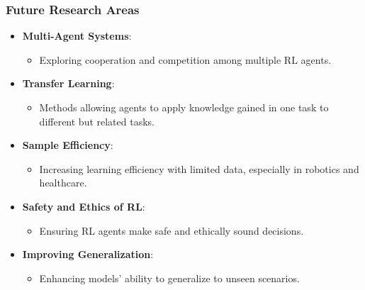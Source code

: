 \documentclass[aspectratio=169]{beamer}
\begin{document}
\begin{frame}[fragile]
    \frametitle{Future Research Areas}
    \begin{itemize}
        \item \textbf{Multi-Agent Systems}:
            \begin{itemize}
                \item Exploring cooperation and competition among multiple RL agents.
            \end{itemize}
        \item \textbf{Transfer Learning}:
            \begin{itemize}
                \item Methods allowing agents to apply knowledge gained in one task to different but related tasks.
            \end{itemize}
        \item \textbf{Sample Efficiency}:
            \begin{itemize}
                \item Increasing learning efficiency with limited data, especially in robotics and healthcare.
            \end{itemize}
        \item \textbf{Safety and Ethics of RL}:
            \begin{itemize}
                \item Ensuring RL agents make safe and ethically sound decisions.
            \end{itemize}
        \item \textbf{Improving Generalization}:
            \begin{itemize}
                \item Enhancing models' ability to generalize to unseen scenarios.
            \end{itemize}
    \end{itemize}
\end{frame}
\end{document}
